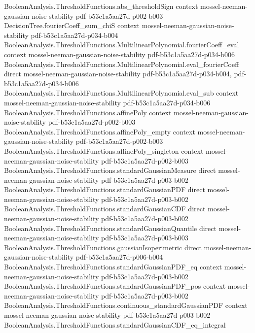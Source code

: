 \begin{theorem}
  {BooleanAnalysis.ThresholdFunctions.abs_thresholdSign}
  {context}
  {mossel-neeman-gaussian-noise-stability}
  {pdf-b53c1a5aa27d-p002-b003}
\proofstep
  {DecisionTree.fourierCoeff_sum_chiS}
  {context}
  {mossel-neeman-gaussian-noise-stability}
  {pdf-b53c1a5aa27d-p034-b004}
\proofstep
  {BooleanAnalysis.ThresholdFunctions.MultilinearPolynomial.fourierCoeff_eval}
  {context}
  {mossel-neeman-gaussian-noise-stability}
  {pdf-b53c1a5aa27d-p034-b006}
\proofstep
  {BooleanAnalysis.ThresholdFunctions.MultilinearPolynomial.eval_fourierCoeff}
  {direct}
  {mossel-neeman-gaussian-noise-stability}
  {pdf-b53c1a5aa27d-p034-b004,
    pdf-b53c1a5aa27d-p034-b006}
\proofstep
  {BooleanAnalysis.ThresholdFunctions.MultilinearPolynomial.eval_sub}
  {context}
  {mossel-neeman-gaussian-noise-stability}
  {pdf-b53c1a5aa27d-p034-b006}
\proofstep
  {BooleanAnalysis.ThresholdFunctions.affinePoly}
  {context}
  {mossel-neeman-gaussian-noise-stability}
  {pdf-b53c1a5aa27d-p002-b003}
\proofstep
  {BooleanAnalysis.ThresholdFunctions.affinePoly_empty}
  {context}
  {mossel-neeman-gaussian-noise-stability}
  {pdf-b53c1a5aa27d-p002-b003}
\proofstep
  {BooleanAnalysis.ThresholdFunctions.affinePoly_singleton}
  {context}
  {mossel-neeman-gaussian-noise-stability}
  {pdf-b53c1a5aa27d-p002-b003}
\proofstep
  {BooleanAnalysis.ThresholdFunctions.standardGaussianMeasure}
  {direct}
  {mossel-neeman-gaussian-noise-stability}
  {pdf-b53c1a5aa27d-p003-b002}
\proofstep
  {BooleanAnalysis.ThresholdFunctions.standardGaussianPDF}
  {direct}
  {mossel-neeman-gaussian-noise-stability}
  {pdf-b53c1a5aa27d-p003-b002}
\proofstep
  {BooleanAnalysis.ThresholdFunctions.standardGaussianCDF}
  {direct}
  {mossel-neeman-gaussian-noise-stability}
  {pdf-b53c1a5aa27d-p003-b002}
\proofstep
  {BooleanAnalysis.ThresholdFunctions.standardGaussianQuantile}
  {direct}
  {mossel-neeman-gaussian-noise-stability}
  {pdf-b53c1a5aa27d-p003-b003}
\proofstep
  {BooleanAnalysis.ThresholdFunctions.gaussianIsoperimetric}
  {direct}
  {mossel-neeman-gaussian-noise-stability}
  {pdf-b53c1a5aa27d-p006-b004}
\proofstep
  {BooleanAnalysis.ThresholdFunctions.standardGaussianPDF_eq}
  {context}
  {mossel-neeman-gaussian-noise-stability}
  {pdf-b53c1a5aa27d-p003-b002}
\proofstep
  {BooleanAnalysis.ThresholdFunctions.standardGaussianPDF_pos}
  {context}
  {mossel-neeman-gaussian-noise-stability}
  {pdf-b53c1a5aa27d-p003-b002}
\proofstep
  {BooleanAnalysis.ThresholdFunctions.continuous_standardGaussianPDF}
  {context}
  {mossel-neeman-gaussian-noise-stability}
  {pdf-b53c1a5aa27d-p003-b002}
\proofstep
  {BooleanAnalysis.ThresholdFunctions.standardGaussianCDF_eq_integral}

\end{theorem}
